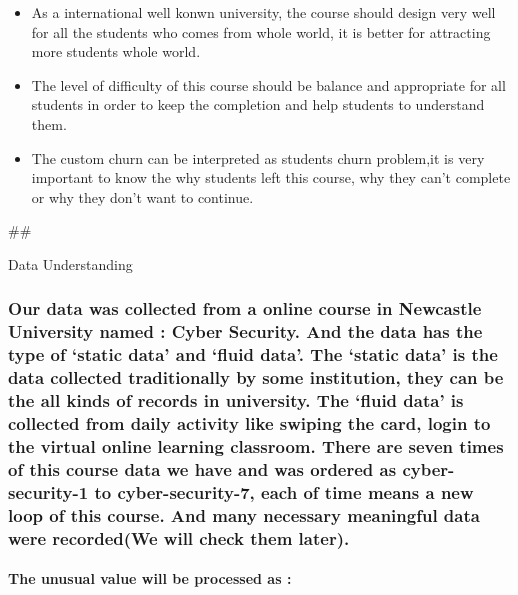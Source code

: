 \documentclass[11pt]{article}
\providecommand{\tightlist}{%
      \setlength{\itemsep}{0pt}\setlength{\parskip}{0pt}}
\begin{document}
\begin{itemize}
\tightlist
\item
  As a international well konwn university, the course should design
  very well for all the students who comes from whole world, it is
  better for attracting more students whole world.
\item
  The level of difficulty of this course should be balance and
  appropriate for all students in order to keep the completion and help
  students to understand them.
\item
  The custom churn can be interpreted as students churn problem,it is
  very important to know the why students left this course, why they
  can't complete or why they don't want to continue.
\end{itemize}

    \#\#

Data Understanding

    \subsubsection{Our data was collected from a online course in Newcastle
University named : Cyber Security. And the data has the type of `static
data' and `fluid data'. The `static data' is the data collected
traditionally by some institution, they can be the all kinds of records
in university. The `fluid data' is collected from daily activity like
swiping the card, login to the virtual online learning classroom. There
are seven times of this course data we have and was ordered as
cyber-security-1 to cyber-security-7, each of time means a new loop of
this course. And many necessary meaningful data were recorded(We will
check them
later).}\label{our-data-was-collected-from-a-online-course-in-newcastle-university-named-cyber-security.-and-the-data-has-the-type-of-static-data-and-fluid-data.-the-static-data-is-the-data-collected-traditionally-by-some-institution-they-can-be-the-all-kinds-of-records-in-university.-the-fluid-data-is-collected-from-daily-activity-like-swiping-the-card-login-to-the-virtual-online-learning-classroom.-there-are-seven-times-of-this-course-data-we-have-and-was-ordered-as-cyber-security-1-to-cyber-security-7-each-of-time-means-a-new-loop-of-this-course.-and-many-necessary-meaningful-data-were-recordedwe-will-check-them-later.}

    \paragraph{The unusual value will be processed as
:}\label{the-unusual-value-will-be-processed-as}
\end{document}
